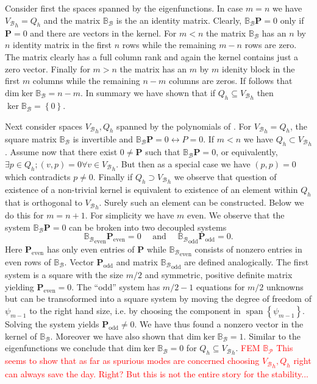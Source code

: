 \documentclass[a4paper,10pt]{article}
\newcommand{\inner}[2]{\ensuremath{\left(#1, #2\right)}}
\newcommand{\Vb}{\ensuremath{V_{\mathcal{B}}}}
\newcommand{\Bp}{\ensuremath{\mathbb{B}_{\mathcal{P}}}}
\newcommand{\Bb}{\ensuremath{\mathbb{B}_{\mathcal{B}}}}
\newcommand{\Pvec}{\ensuremath{\mathbf{P}}}
\newcommand{\TODO}[1]{\textcolor{red}{#1}}
\DeclareMathOperator{\spn}{span}
\begin{document}
Consider first the spaces spanned by the eigenfunctions. In case $m=n$ we have
${\Vb}_h=Q_h$ and the matrix $\Bb$ is the an identity matrix. Clearly, $\Bb\Pvec=0$
only if $\Pvec=0$ and there are vectors in the kernel. For $m<n$ the matrix $\Bb$
has an $n$ by $n$ identity matrix in the first $n$ rows while the remaining
$m-n$ rows are zero. The matrix clearly has a full column rank and again
the kernel contains just a zero vector. Finally for $m > n$ the matrix has an
$m$ by $m$ idenity block in the first $m$ columns while the remaining $n-m$ 
columns are zeros. If follows that $\text{dim}\ker\Bb=n-m$. In summary we have
shown that if $Q_h\subseteq {\Vb}_h$ then $\ker\Bb=\left\{0\right\}$.

Next consider spaces ${\Vb}_h, Q_h$ spanned by the polynomials of
\cite{shen_leg}. For ${\Vb}_h=Q_h$, the square matrix $\Bb$ is invertible
and $\Bb\Pvec=0 \leftrightarrow P=0$. If $m<n$ we have $Q_h\subset{\Vb}_h$.
Assume now that there exist $0\neq\Pvec$ such that $\Bb\Pvec = 0$, or
equivalently, $\exists p\in Q_h; \inner{v}{p} = 0\forall v\in{\Vb}_h$. But then
as a special case we have $\inner{p}{p} = 0$ which contradicts $p\neq 0$.
Finally if $Q_h\supset{\Vb}_h$ we observe that question of existence of a
non-trivial kernel is equivalent to existence of an element within $Q_h$ that is
orthogonal to ${\Vb}_h$. Surely such an element can be constructed. Below we
do this for $m=n+1$. For simplicity we have $m$ even. We observe that the
system $\Bb\Pvec=0$ can be broken into two decoupled systems
\[ {\Bb}_{\text{even}}\Pvec_{\text{even}}=0
  \quad\text{ and }\quad
  {\Bb}_{\text{odd}}\Pvec_{\text{odd}}=0.
\]
Here $\Pvec_{\text{even}}$ has only even entries of $\Pvec$ while
${\Bb}_{\text{even}}$ consists of nonzero entries in even rows of $\Bb$. Vector
$\Pvec_{\text{odd}}$ and matrix ${\Bb}_{\text{odd}}$ are defined analogically.
The first system is a square with the size $m/2$ and symmetric, positive
definite matrix yielding $\Pvec_{\text{even}}=0$. The ``odd'' system has
$m/2-1$ equations for $m/2$ unknowns but can be transoformed into a square 
system by moving the degree of freedom of $\psi_{m-1}$ to the right hand size,
i.e. by choosing the component in $\spn\left\{\psi_{m-1}\right\}$. Solving the
system yields $\Pvec_{\text{odd}}\neq 0$. We have thus found a nonzero vector
in the kernel of $\Bb$. Moreover we have also shown that $\text{dim}\ker\Bb=1$.
Similar to the eigenfunctions we conclude that $\text{dim}\ker\Bb=0$ for
$Q_h\subseteq {\Vb}_h$.
\TODO{FEM}
\TODO{$\Bp$}
\TODO{This seems to show that as far as spurious modes are concerned choosing
${\Vb}_h, Q_h$ right can always save the day. Right? But this is not the entire
story for the stability...}
\end{document}

